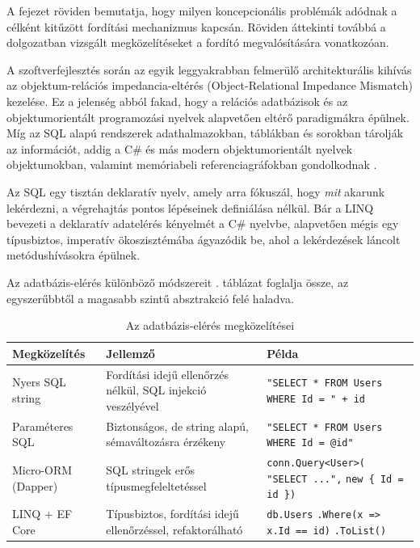 
A fejezet röviden bemutatja, hogy milyen koncepcionális problémák adódnak a célként kitűzött fordítási mechanizmus kapcsán. Röviden áttekinti továbbá a dolgozatban vizsgált megközelítéseket a fordító megvalósítására vonatkozóan.


A szoftverfejlesztés során az egyik leggyakrabban felmerülő architekturális kihívás az ob\-jek\-tum-relációs impedancia-eltérés (Object-Relational Impedance Mismatch) kezelése. Ez a jelenség abból fakad, hogy a relációs adatbázisok és az objektumorientált programozási nyelvek alapvetően eltérő paradigmákra épülnek. Míg az SQL alapú rendszerek adathalmazokban, táblákban és sorokban tárolják az információt, addig a C\# és más modern objektumorientált nyelvek objektumokban, valamint memóriabeli referenciagráfokban gondolkodnak \cite{skeet2019csharp}. 

Az SQL egy tisztán deklaratív nyelv, amely arra fókuszál, hogy \emph{mit} akarunk lekérdezni, a végrehajtás pontos lépéseinek definiálása nélkül. Bár a LINQ bevezeti a deklaratív adatelérés kényelmét a C\# nyelvbe, alapvetően mégis egy típusbiztos, imperatív ökoszisztémába ágyazódik be, ahol a lekérdezések láncolt metódushívásokra épülnek.


Az adatbázis-elérés különböző módszereit . táblázat foglalja össze, az egyszerűbbtől a magasabb szintű absztrakció felé haladva.

\begin{table}[h]
	\centering
	\caption{Az adatbázis-elérés megközelítései}
	\label{tab:adatbazis-eleres}
	\renewcommand{\arraystretch}{1.4}
	\small
	\begin{tabular}{|p{}|p{}|p{}|}
		\hline
		\textbf{Megközelítés} & \textbf{Jellemző} & \textbf{Példa} \\
		\hline
		Nyers SQL string & Fordítási idejű ellenőrzés nélkül, SQL injekció veszélyével &
		\texttt{"SELECT * FROM Users} \newline \texttt{WHERE Id = " + id} \\
		\hline
		Paraméteres SQL & Biztonságos, de string alapú, sémaváltozásra érzékeny &
		\texttt{"SELECT * FROM Users} \newline \texttt{WHERE Id = @id"} \\
		\hline
		Micro-ORM (Dapper) & SQL stringek erős típusmegfeleltetéssel &
		\texttt{conn.Query<User>(} \newline \texttt{"SELECT ...",} \newline \texttt{new \{ Id = id \})} \\
		\hline
		LINQ + EF Core & Típusbiztos, fordítási idejű ellenőrzéssel, refaktorálható &
		\texttt{db.Users} \newline \texttt{.Where(x => x.Id == id)} \newline \texttt{.ToList()} \\
		\hline
	\end{tabular}
\end{table}

